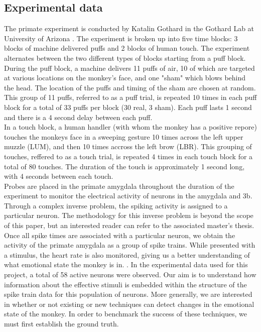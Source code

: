 \documentclass[12pt]{article}
\begin{document}
\subsection{Experimental data}The primate experiment is conducted by Katalin Gothard in the Gothard Lab at University
of Arizona \cite{lab}. The experiment is broken up into five time blocks: 3 blocks of machine delivered puffs and 2 blocks of human touch. The experiment alternates between the two different types of blocks starting from a puff block. During the puff block, a machine delivers 11 puffs of air, 10 of which are targeted at various locations on the monkey's face, and one "sham" which blows behind the head. The location of the puffs and timing of the sham are chosen at random. This group of 11 puffs, referred to as a puff trial, is repeated 10 times in each puff block for a total of 33 puffs per block (30 real, 3 sham). Each puff lasts 1 second and there is a 4 second delay between each puff. \\
 In a touch block, a human handler (with whom the monkey has a positive repore) touches the monkeys face in a sweeping gesture 10 times across the left upper muzzle (LUM), and then 10 times accross the left brow (LBR). This grouping of touches, reffered to as a touch trial, is repeated 4 times in each touch block for a total of 80 touches. The duration of the touch is approximately 1 second long, with 4 seconds between each touch.  \\
Probes are placed in the primate amygdala throughout the duration of the experiment
to monitor the electrical activity of neurons in the amygdala and 3b. Through a complex inverse problem, the spiking activity is assigned to a particular
neuron. The methodology for this inverse problem is beyond the scope of this paper,
but an interested reader can refer to the associated master's thesis. Once all spike
times are associated with a particular neuron, we obtain the activity of the primate
amygdala as a group of spike trains. While presented
with a stimulus, the heart rate is also monitored, giving us a better understanding of what emotional state the monkey is in. \cite{gothard}. In the experimental data used for this project, a
total of 58 active neurons were observed.
Our aim is to understand how information
about the effective stimuli is embedded within the structure of the spike train data for
this population of neurons. More generally, we are interested in whether or not existing or new techniques can detect changes in the emotional state of the monkey. In order to benchmark the success of these techniques, we must first establish the ground truth.
\end{document}
